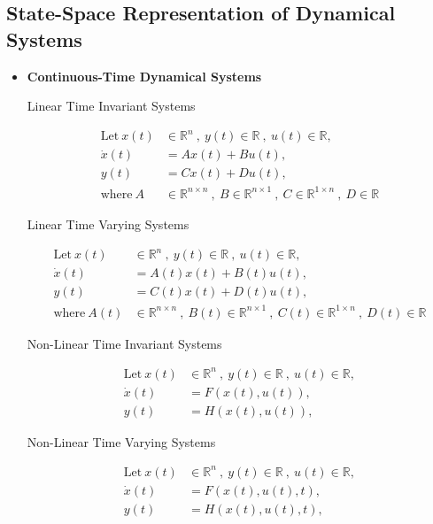 \documentclass[12pt,oneside]{amsart}
\begin{document}
\subsection{State-Space Representation of Dynamical Systems}

\begin{itemize}

\item \textbf{Continuous-Time Dynamical Systems}

Linear Time Invariant Systems

\begin{align*}
  \mathrm{Let} \ x(t) &\in \mathbb{R}^n \ , \ y(t) \in \mathbb{R} \ ,\  u(t) \in
  \mathbb{R} , \\
  \dot{x}(t) &= A x(t) + B u(t) , \\
  y(t) &= C x(t) + D u(t) , \\
  \mathrm{where} \ A &\in \mathbb{R}^{n \times n} \ , \ 
    B \in \mathbb{R}^{n \times 1} \ ,\  C \in \mathbb{R}^{1 \times n} \ , \ D \in \mathbb{R}
\end{align*}

Linear Time Varying Systems

\begin{align*}
  \mathrm{Let} \ x(t) &\in \mathbb{R}^n \ , \ y(t) \in \mathbb{R} \ ,\  u(t) \in
  \mathbb{R} , \\
  \dot{x}(t) &= A(t) x(t) + B(t) u(t) , \\
  y(t) &= C(t) x(t) + D(t) u(t) , \\
  \mathrm{where} \ A(t) &\in \mathbb{R}^{n \times n} \ , \ 
    B(t) \in \mathbb{R}^{n \times 1} \ ,\  C(t) \in \mathbb{R}^{1 \times n} \ , \ D(t) \in \mathbb{R}
\end{align*}

Non-Linear Time Invariant Systems

\begin{align*}
  \mathrm{Let} \ x(t) &\in \mathbb{R}^n \ , \ y(t) \in \mathbb{R} \ ,\  u(t) \in
  \mathbb{R} , \\
  \dot{x}(t) &= F(x(t),u(t)) , \\
  y(t) &= H(x(t),u(t)) , 
\end{align*}

Non-Linear Time Varying Systems

\begin{align*}
  \mathrm{Let} \ x(t) &\in \mathbb{R}^n \ , \ y(t) \in \mathbb{R} \ ,\  u(t) \in
  \mathbb{R} , \\
  \dot{x}(t) &= F(x(t),u(t),t) , \\
  y(t) &= H(x(t),u(t),t) , 
\end{align*}


\end{itemize}
\end{document}
